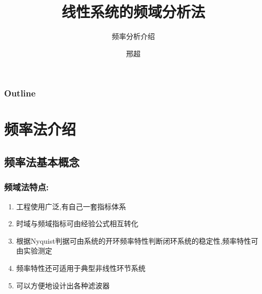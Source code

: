 \documentclass[table]{beamer}
\subtitle{频率分析介绍}
\title{线性系统的频域分析法}
\author{邢超}
\date{}
\begin{document}
\maketitle

\begin{frame}
\frametitle{Outline}
\setcounter{tocdepth}{3}
\tableofcontents
\end{frame}










\section{频率法介绍}
\label{sec-1}
\subsection{频率法基本概念}
\label{sec-1-1}
\begin{frame}
\frametitle{频域法特点:}
\label{sec-1-1-1}

\begin{enumerate}
\item <2->工程使用广泛,有自己一套指标体系
\item <3->时域与频域指标可由经验公式相互转化
\item <4->根据Nyquist判据可由系统的开环频率特性判断闭环系统的稳定性,频率特性可由实验测定
\item <5->频率特性还可适用于典型非线性环节系统
\item <6->可以方便地设计出各种滤波器
\end{enumerate}
\end{frame}
\end{document}
